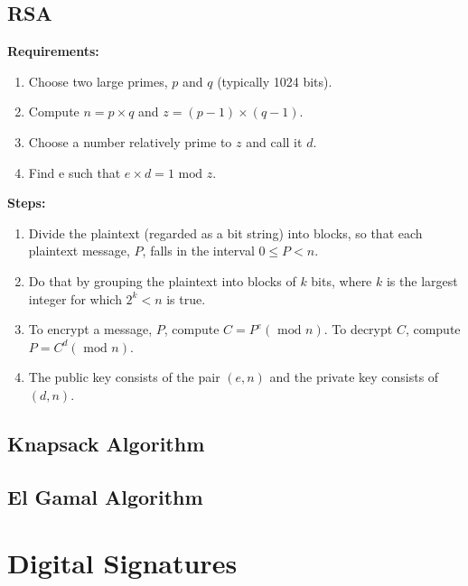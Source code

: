 \documentclass[a4paper,oneside]{book}
\begin{document}
\subsection{RSA}
\textbf{Requirements:}
\begin{enumerate}
\item Choose two large primes, $p$ and $q$ (typically 1024 bits).
\item Compute $n = p \times q$ and $z = (p - 1) \times (q - 1)$.
\item Choose a number relatively prime to $z$ and call it $d$.
\item Find e such that $e \times d = 1 \text{ mod } z$.
\end{enumerate}
\textbf{Steps:}
\begin{enumerate}
\item Divide the plaintext (regarded as a bit string) into blocks, so that each plaintext message, $P$, falls in the interval $0 \le P < n$. 
\item Do that by grouping the plaintext into blocks of $k$ bits, where $k$ is the largest integer for which $2^k < n$ is true.
\item To encrypt a message, $P$, compute $C = P^e (\text{ mod }n)$. To decrypt $C$, compute $P = C^d (\text{ mod } n)$. 
\item  The public key consists of the pair $(e, n)$ and the private key consists of $(d, n)$.
\end{enumerate}
\subsection{Knapsack Algorithm}
\subsection{El Gamal Algorithm}
\section{Digital Signatures}
\end{document}
